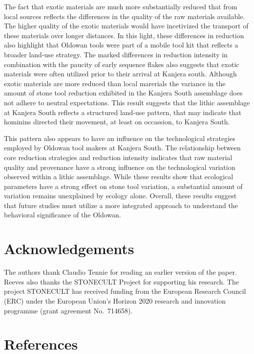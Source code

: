 \documentclass[]{elsarticle} %
\begin{document}
The fact that exotic materials are much more substantially reduced that
from local sources reflects the differences in the quality of the raw
materials available. The higher quality of the exotic materials would
have incetivized the transport of these materials over longer distances.
In this light, these differences in reduction also highlight that
Oldowan tools were part of a mobile tool kit that reflects a broader
land-use strategy. The marked differences in reduction intensity in
combination with the paucity of early sequence flakes also suggests that
exotic materials were often utilized prior to their arrival at Kanjera
south. Although exotic materials are more reduced than local marerials
the variance in the amount of stone tool reduction exhibited in the
Kanjera South assemblage does not adhere to neutral expectations. This
result suggests that the lithic assemblage at Kanjera South reflects a
structured land-use pattern, that may indicate that hominins directed
their movement, at least on occassion, to Kanjera South.

This pattern also appears to have an influence on the technological
strategies employed by Oldowan tool makers at Kanjera South. The
relationship between core reduction strategies and reduction intensity
indicates that raw material quality and provenance have a strong
influence on the technological variation observed within a lithic
assemblage. While these results show that ecological parameters have a
strong effect on stone tool variation, a substantial amount of variation
remains unexplained by ecology alone. Overall, these results suggest
that future studies must utilize a more integrated approach to
understand the behavioral significance of the Oldowan.

\hypertarget{acknowledgements}{%
\section{Acknowledgements}\label{acknowledgements}}

The authors thank Claudio Tennie for reading an earlier version of the
paper. Reeves also thanks the STONECULT Project for supporting his
research. The project STONECULT has received funding from the European
Research Council (ERC) under the European Union's Horizon 2020 research
and innovation programme (grant agreement No.~714658).

\hypertarget{references}{%
\section*{References}\label{references}}
\end{document}
